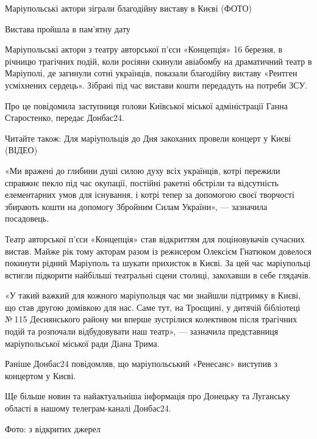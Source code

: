  
 
 
 
 

Маріупольські актори зіграли благодійну виставу в Києві (ФОТО)

Вистава пройшла в пам’ятну дату

Маріупольські актори з театру авторської п'єси «Концепція» 16 березня, в
річницю трагічних подій, коли росіяни скинули авіабомбу на драматичний театр в
Маріуполі, де загинули сотні українців, показали благодійну виставу «Рентген
усміхнених сердець». Зібрані під час вистави кошти передадуть на потреби ЗСУ.

Про це повідомила заступниця голови Київської міської адміністрації Ганна
Старостенко, передає Донбас24.

Читайте також: Для маріупольців до Дня закоханих провели концерт у Києві
(ВІДЕО)

«Ми вражені до глибини душі силою духу всіх українців, котрі пережили справжнє
пекло під час окупації, постійні ракетні обстріли та відсутність елементарних
умов для існування, і котрі тепер за допомогою своєї творчості збирають кошти
на допомогу Збройним Силам України», — зазначила посадовець.

Театр авторської п'єси «Концепція» став відкриттям для поціновувачів сучасних
вистав. Майже рік тому акторам разом із режисером Олексієм Гнатюком довелося
покинути рідний Маріуполь та шукати прихисток в Києві. За цей час маріупольці
встигли підкорити найбільші театральні сцени столиці, закохавши в себе
глядачів.

«У такий важкий для кожного маріупольця час ми знайшли підтримку в Києві, що
став другою домівкою для нас. Саме тут, на Троєщині, у дитячій бібліотеці № 115
Деснянського району ми вперше зустрілися колективом після трагічних подій та
розпочали відбудовувати наш театр», — зазначила представниця маріупольської
міської ради Діана Трима.

Раніше Донбас24 повідомляв, що маріупольський «Ренесанс» виступив з концертом у
Києві.

Ще більше новин та найактуальніша інформація про Донецьку та Луганську області
в нашому телеграм-каналі Донбас24.

Фото: з відкритих джерел
